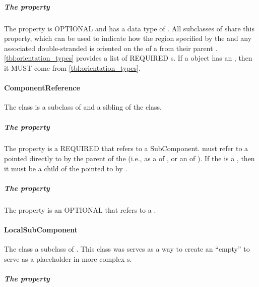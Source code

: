 \subparagraph{The  property}\label{sec:orientation2}
The  property is OPTIONAL and has a data type of . All subclasses of  share this property, which can be used to indicate how the region specified by the  and any associated double-stranded  is oriented on the  of a   from their parent . \ref{tbl:orientation_types} provides a list of REQUIRED  s. If a  object has an , then it MUST come from \ref{tbl:orientation_types}.



\paragraph{ComponentReference}
\label{sec:ComponentReference}

The  class is a subclass of  and a sibling of the  class. 


\subparagraph{The  property}\label{sec:inChildOf}

The  property is a REQUIRED  that refers to a SubComponent.  must refer to a  pointed directly to by the parent of the  (i.e., as a  of , or an  of ). If the  is a , then it must be a child of the  pointed to by .

\subparagraph{The  property}\label{sec:feature:CR}

The  property is an OPTIONAL  that refers to a .

\paragraph{LocalSubComponent}
\label{sec:LocalSubComponent}

The  class a subclass of . This class was serves as a way to create an ``empty''  to serve as a placeholder in more complex s. 

\subparagraph{The  property}\label{sec:type:LSC}


